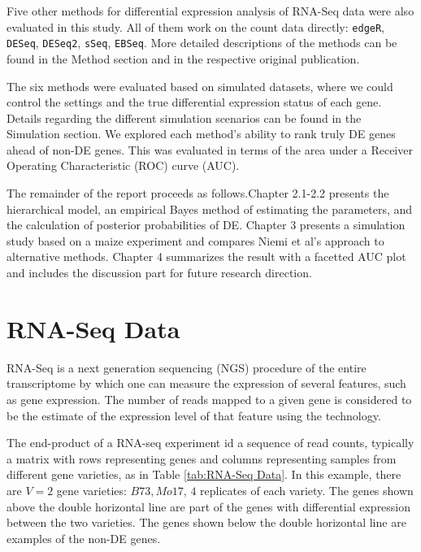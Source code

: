 Five other methods for differential expression analysis of RNA-Seq data were also evaluated in this study. All of them work on the count data directly: {\tt edgeR}\citep{robinson2010edger}, {\tt DESeq}\citep{anders2010differential}, {\tt DESeq2}\cite{love2014moderated}, {\tt sSeq}\citep{yu2013sseq}, {\tt EBSeq}\citep{leng2013ebseq}. More detailed descriptions of the methods can be found in the Method section and in the respective original publication. 

The six methods were evaluated based on simulated datasets, where we could control the settings and the true differential expression status of each gene. Details regarding the different simulation scenarios can be found in the Simulation section. We explored each method's ability to rank truly DE genes ahead of non-DE genes. This was evaluated in terms of the area under a Receiver Operating Characteristic (ROC) curve (AUC). 

The remainder of the report proceeds as follows.Chapter 2.1-2.2 presents the hierarchical model, an empirical Bayes method of estimating the parameters, and the calculation of posterior probabilities of DE. Chapter 3 presents a simulation study based on a maize experiment and compares Niemi et al's approach to alternative methods. Chapter 4 summarizes the result with a facetted AUC plot and includes the discussion part for future research direction. 


\section{RNA-Seq Data}

RNA-Seq is a next generation sequencing (NGS) procedure of the entire transcriptome by which one can measure the expression of several features, such as gene expression. The number of reads mapped to a given gene is considered to be the estimate of the expression level of that feature using the technology\citep{marioni2008rna}.

The end-product of a RNA-seq experiment id a sequence of read counts, typically a matrix with rows representing genes and columns representing samples from different gene varieties, as in Table \ref{tab:RNA-Seq Data}. In this example, there are $V=2$ gene varieties: $B73, Mo17$, $4$ replicates of each variety. The genes shown above the double horizontal line are part of the genes with differential expression between the two varieties. The genes shown below the double horizontal line are examples of the non-DE genes. 

